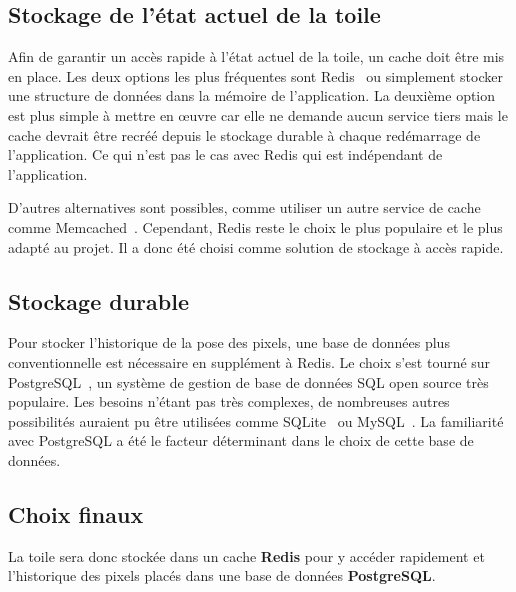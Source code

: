 \subsection{Stockage de l'état actuel de la toile}

Afin de garantir un accès rapide à l'état actuel de la toile, un cache doit être mis en place. Les deux options les plus fréquentes sont Redis~\cite{redis} ou simplement stocker une structure de données dans la mémoire de l'application. La deuxième option est plus simple à mettre en \oe{}uvre car elle ne demande aucun service tiers mais le cache devrait être recréé depuis le stockage durable à chaque redémarrage de l'application. Ce qui n'est pas le cas avec Redis qui est indépendant de l'application.

D'autres alternatives sont possibles, comme utiliser un autre service de cache comme Memcached~\cite{memcached}. Cependant, Redis reste le choix le plus populaire et le plus adapté au projet. Il a donc été choisi comme solution de stockage à accès rapide.

\subsection{Stockage durable}

Pour stocker l'historique de la pose des pixels, une base de données plus conventionnelle est nécessaire en supplément à Redis. Le choix s'est tourné sur PostgreSQL~\cite{postgresql}, un système de gestion de base de données SQL open source très populaire. Les besoins n'étant pas très complexes, de nombreuses autres possibilités auraient pu être utilisées comme SQLite~\cite{sqlite} ou MySQL~\cite{mysql}. La familiarité avec PostgreSQL a été le facteur déterminant dans le choix de cette base de données.

\subsection{Choix finaux}

La toile sera donc stockée dans un cache \textbf{Redis} pour y accéder rapidement et l'historique des pixels placés dans une base de données \textbf{PostgreSQL}.
